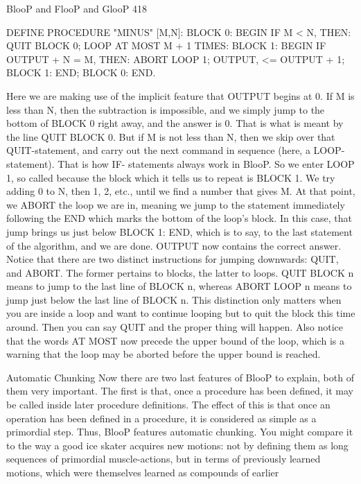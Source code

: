 BlooP and FlooP and GlooP                                                                 418

DEFINE PROCEDURE "MINUS" [M,N]:
BLOCK 0: BEGIN
     IF M < N, THEN:
     QUIT BLOCK 0;
     LOOP AT MOST M + 1 TIMES:
     BLOCK 1: BEGIN
                 IF OUTPUT + N = M, THEN:
                 ABORT LOOP 1;
                 OUTPUT, <= OUTPUT + 1;
     BLOCK 1: END;
BLOCK 0: END.

        Here we are making use of the implicit feature that OUTPUT begins at 0. If M is
less than N, then the subtraction is impossible, and we simply jump to the bottom of
BLOCK 0 right away, and the answer is 0. That is what is meant by the line QUIT
BLOCK 0. But if M is not less than N, then we skip over that QUIT-statement, and
carry out the next command in sequence (here, a LOOP-statement). That is how IF-
statements always work in BlooP.
        So we enter LOOP 1, so called because the block which it tells us to repeat is
BLOCK 1. We try adding 0 to N, then 1, 2, etc., until we find a number that gives M. At
that point, we ABORT the loop we are in, meaning we jump to the statement
immediately following the END which marks the bottom of the loop's block. In this case,
that jump brings us just below BLOCK 1: END, which is to say, to the last statement of
the algorithm, and we are done. OUTPUT now contains the correct answer.
        Notice that there are two distinct instructions for jumping downwards: QUIT, and
ABORT. The former pertains to blocks, the latter to loops. QUIT BLOCK n means to
jump to the last line of BLOCK n, whereas ABORT LOOP n means to jump just below
the last line of BLOCK n. This distinction only matters when you are inside a loop and
want to continue looping but to quit the block this time around. Then you can say QUIT
and the proper thing will happen.
        Also notice that the words AT MOST now precede the upper bound of the loop,
which is a warning that the loop may be aborted before the upper bound is reached.

                                Automatic Chunking
Now there are two last features of BlooP to explain, both of them very important. The
first is that, once a procedure has been defined, it may be called inside later procedure
definitions. The effect of this is that once an operation has been defined in a procedure, it
is considered as simple as a primordial step. Thus, BlooP features automatic chunking.
You might compare it to the way a good ice skater acquires new motions: not by defining
them as long sequences of primordial muscle-actions, but in terms of previously learned
motions, which were themselves learned as compounds of earlier





